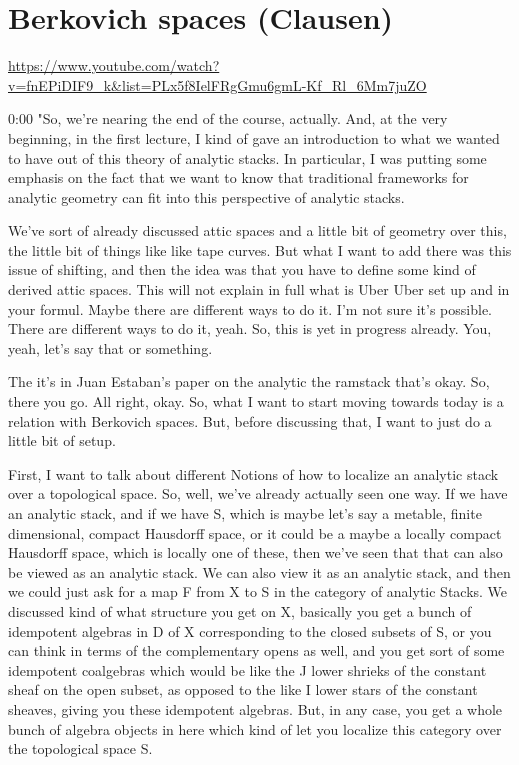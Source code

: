 
\section{\ufs Berkovich spaces (Clausen)}

\url{https://www.youtube.com/watch?v=fnEPiDIF9_k&list=PLx5f8IelFRgGmu6gmL-Kf_Rl_6Mm7juZO}
\renewcommand{\yt}[2]{\href{https://www.youtube.com/watch?v=fnEPiDIF9_k&list=PLx5f8IelFRgGmu6gmL-Kf_Rl_6Mm7juZO&t=#1}{#2}}
\vspace{1em}

\begin{unfinished}{0:00}
"So, we're nearing the end of the course, actually. And, at the very beginning, in the first lecture, I kind of gave an introduction to what we wanted to have out of this theory of analytic stacks. In particular, I was putting some emphasis on the fact that we want to know that traditional frameworks for analytic geometry can fit into this perspective of analytic stacks.

We've sort of already discussed attic spaces and a little bit of geometry over this, the little bit of things like like tape curves. But what I want to add there was this issue of shifting, and then the idea was that you have to define some kind of derived attic spaces. This will not explain in full what is Uber Uber set up and in your formul. Maybe there are different ways to do it. I'm not sure it's possible. There are different ways to do it, yeah. So, this is yet in progress already. You, yeah, let's say that or something. 

The it's in Juan Estaban's paper on the analytic the ramstack that's okay. So, there you go. All right, okay. So, what I want to start moving towards today is a relation with Berkovich spaces. But, before discussing that, I want to just do a little bit of setup.

First, I want to talk about different Notions of how to localize an analytic stack over a topological space. So, well, we've already actually seen one way. If we have an analytic stack, and if we have S, which is maybe let's say a metable, finite dimensional, compact Hausdorff space, or it could be a maybe a locally compact Hausdorff space, which is locally one of these, then we've seen that that can also be viewed as an analytic stack. We can also view it as an analytic stack, and then we could just ask for a map F from X to S in the category of analytic Stacks. We discussed kind of what structure you get on X, basically you get a bunch of idempotent algebras in D of X corresponding to the closed subsets of S, or you can think in terms of the complementary opens as well, and you get sort of some idempotent coalgebras which would be like the J lower shrieks of the constant sheaf on the open subset, as opposed to the like I lower stars of the constant sheaves, giving you these idempotent algebras. But, in any case, you get a whole bunch of algebra objects in here which kind of let you localize this category over the topological space S.


\end{unfinished}
